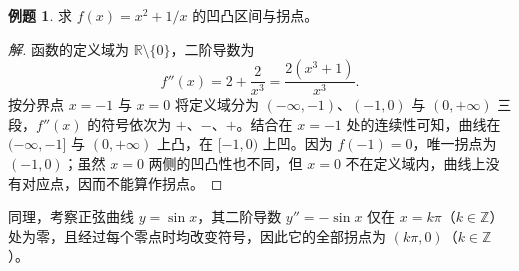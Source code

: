 \documentclass[UTF8,fontset=fandol,a4paper,12pt]{ctexart}
\theoremstyle{definition}
\newtheorem{example}[theorem]{例题}
\begin{document}
\begin{example}
求 $f(x)=x^2+1/x$ 的凹凸区间与拐点。
\end{example}

\begin{proof}[解]
函数的定义域为 $\mathbb R\setminus\{0\}$，二阶导数为
\[
 f''(x)=2+\frac{2}{x^3}=\frac{2(x^3+1)}{x^3}.
\]
按分界点 $x=-1$ 与 $x=0$ 将定义域分为 $(-\infty,-1)$、$(-1,0)$ 与 $(0,+\infty)$ 三段，$f''(x)$ 的符号依次为 $+$、$-$、$+$。结合在 $x=-1$ 处的连续性可知，曲线在 $(-\infty,-1]$ 与 $(0,+\infty)$ 上凸，在 $[-1,0)$ 上凹。因为 $f(-1)=0$，唯一拐点为 $(-1,0)$；虽然 $x=0$ 两侧的凹凸性也不同，但 $x=0$ 不在定义域内，曲线上没有对应点，因而不能算作拐点。
\end{proof}

同理，考察正弦曲线 $y=\sin x$，其二阶导数 $y''=-\sin x$ 仅在 $x=k\pi$（$k\in\mathbb Z$）处为零，且经过每个零点时均改变符号，因此它的全部拐点为 $(k\pi,0)$（$k\in\mathbb Z$）。
\end{document}
